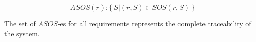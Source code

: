 $$ ASOS(r) : \{\ S | (r,S) \in SOS(r,S)\ \} $$

The set of $ASOS$-es for all requirements represents the complete traceability of the system.

%




%
%
%
%
%

